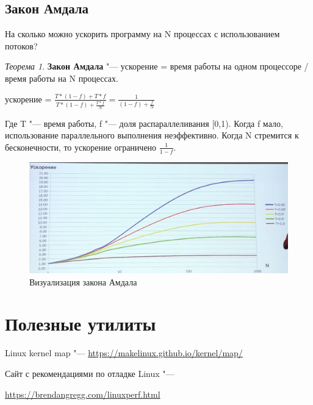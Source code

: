 \documentclass[bachelor, och, book]{SCWorks}
\theoremstyle{remark}
\newtheorem{theorem}{Теорема}
\begin{document}
    \subsection{Закон Амдала}

    На сколько можно ускорить программу на N процессах с использованием потоков?

    \begin{theorem}
        \textbf{Закон Амдала} "--- ускорение = время работы на одном процессоре / время работы на N процессах.
    \end{theorem}

    \huge
    ускорение =  $\frac{T * (1 - f) + T * f}{T * (1 - f) + \frac{T * f}{N}} = \frac{1}{(1-f) + \frac{f}{N}}$
    \normalsize

    \hfill \break
    Где T "--- время работы, f "--- доля распараллеливания [0,1). Когда f мало, использование параллельного выполнения неэффективно. Когда N стремится к бесконечности, то ускорение ограничено $\frac{1}{1 - f}$.

    \begin{figure}[H]
        \begin{center}
            \includegraphics[scale=0.40]{res/Amdahl's-law.png}
            \caption{Визуализация закона Амдала}
        \end{center}
    \end{figure}

    \section{Полезные утилиты}

    Linux kernel map "--- \href{https://makelinux.github.io/kernel/map/}{https://makelinux.github.io/kernel/map/}

    Сайт с рекомендациями  по отладке Linux "--- 
    
    \href{https://brendangregg.com/linuxperf.html}{https://brendangregg.com/linuxperf.html}
\end{document}
